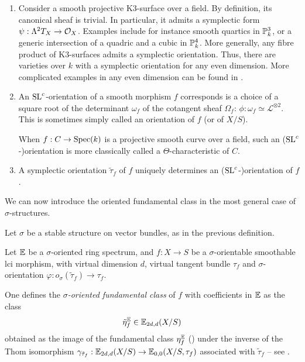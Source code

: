 \begin{ex}\label{ex:orientations}
\begin{enumerate}
\item Consider a smooth projective K3-surface over a field. 
 By definition, its canonical sheaf is trivial. In particular, it admits a symplectic form
 $\psi:\Lambda^2 T_X \rightarrow \mathcal O_X$.
 Examples include for instance smooth quartics in $\mathbb P^3_k$, or a generic intersection of a quadric and a cubic in $\mathbb P^4_k$.
 More generally, any fibre product of $\mathrm{K}3$-surfaces admits a symplectic orientation.
 Thus, there are varieties over $k$ with a symplectic orientation for any even dimension. More complicated examples in any even dimension can be found in \cite{Beauville83}.
\item An $\mathrm{SL}^c$-orientation of a smooth morphism $f$ corresponds is a choice of a square root
 of the determinant $\omega_f$ of the cotangent sheaf $\Omega_f$: $\phi:\omega_f \simeq \mathcal L^{\otimes 2}$.
This is sometimes simply called an orientation of $f$ (or of $X/S$).

When $f:C \rightarrow \operatorname{Spec}(k)$ is a projective smooth curve over a field,
such an ($\mathrm{SL}^c$-)orientation is more classically called a $\Theta$-characteristic of $C$.
\item A symplectic orientation $\tilde \tau_f$ of $f$ uniquely determines
 an ($\mathrm{SL}^c$-)orientation of $f$.
\end{enumerate}
\end{ex}

We can now introduce the oriented fundamental class in the most general case of $\sigma$-structures.
\begin{df}\label{def:orientedfundamentalclass}
Let $\sigma$ be a stable structure on vector bundles, as in the previous definition.

Let $\mathbb E$ be a $\sigma$-oriented ring spectrum,
 and $f:X \rightarrow S$ be a $\sigma$-orientable smoothable lci morphism,
 with virtual dimension $d$, virtual tangent bundle $\tau_f$ and $\sigma$-orientation
 $\varphi:o_\sigma(\tilde \tau_f)\to \tau_f$.

One defines the \emph{$\sigma$-oriented fundamental class} of $f$ with coefficients in $\mathbb E$ as
 the class 
$$\tilde \eta_f^\mathbb E \in \mathbb E_{2d,d}(X/S)$$
obtained as the image of the
 fundamental class $\eta_f^\mathbb E$ () under the inverse of
 the Thom isomorphism $\gamma_{\tilde \tau_f}:\mathbb E_{2d,d}(X/S) \rightarrow \mathbb E_{0,0}(X/S,\tau_f)$
 associated with $\tilde \tau_f$ -- see .
\end{df}

